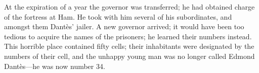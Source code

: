  At the expiration of a year the governor was transferred; he had obtained charge of the fortress at Ham. He took with him several of his subordinates, and amongst them Dantès' jailer. A new governor arrived; it would have been too tedious to acquire the names of the prisoners; he learned their numbers instead. This horrible place contained fifty cells; their inhabitants were designated by the numbers of their cell, and the unhappy young man was no longer called Edmond Dantès—he was now number 34. 